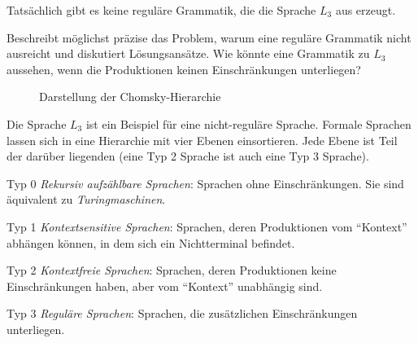 \documentclass[10pt, a4paper]{scrartcl}
\begin{document}
\begin{aufgabe}[symbol=\symPartner]
\label{aufg:grammatik-erweitern}
Tatsächlich gibt es keine reguläre Grammatik, die die Sprache $L_3$ aus  erzeugt.

Beschreibt möglichst präzise das Problem, warum eine reguläre Grammatik nicht ausreicht und diskutiert Lösungsansätze. Wie könnte eine Grammatik zu $L_3$ aussehen, wenn die Produktionen keinen Einschränkungen unterliegen?
\end{aufgabe}

\hrulefill

\begin{wrapfig}
\begin{wrapfigure}[12]{r}{0pt}
\caption*{Darstellung der Chomsky-Hierarchie}
\label{abb:chomsky}
\end{wrapfigure}
Die Sprache $L_3$ ist ein Beispiel für eine nicht-reguläre Sprache. Formale Sprachen lassen sich in eine Hierarchie mit vier Ebenen einsortieren. Jede Ebene ist Teil der darüber liegenden (eine Typ 2 Sprache ist auch eine Typ 3 Sprache).

\begin{smallitemize}
	\item[Typ 0] \emph{Rekursiv aufzählbare Sprachen}: Sprachen ohne Einschränkungen. Sie sind äquivalent zu \emph{Turingmaschinen}.
	\item[Typ 1] \emph{Kontextsensitive Sprachen}: Sprachen, deren Produktionen vom \enquote{Kontext} abhängen können, in dem sich ein Nichtterminal befindet.
	\item[Typ 2] \emph{Kontextfreie Sprachen}: Sprachen, deren Produktionen keine Einschränkungen haben, aber vom \enquote{Kontext} unabhängig sind.
	\item[Typ 3] \emph{Reguläre Sprachen}: Sprachen, die zusätzlichen Einschränkungen unterliegen.
\end{smallitemize}
\end{wrapfig}
\end{document}
